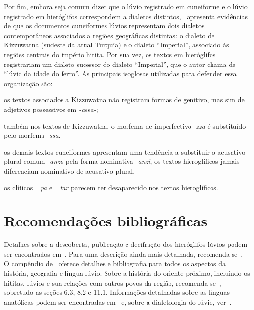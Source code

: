 Por fim, embora seja comum dizer que o lúvio registrado em cuneiforme e o
lúvio registrado em hieróglifos correspondem a dialetos
distintos,~\citet{Yakubovich2010} apresenta evidências de que os
documentos cuneiformes lúvios representam dois dialetos contemporâneos
associados a regiões geográficas distintas: o dialeto de Kizzuwatna (sudeste da
atual Turquia) e o dialeto ``Imperial'', associado às regiões centrais do
império hitita.
Por sua vez, os textos em hieróglifos registrariam um dialeto sucessor do
dialeto ``Imperial'', que o autor chama de ``lúvio da idade do ferro''.
As principais isoglosas utilizadas para defender essa organização são:
\begin{inparaenum}
	\item os textos associados a Kizzuwatna não registram formas de genitivo, mas
	sim de adjetivos possessivos em \emph{-assa-};
	\item também nos textos de Kizzuwatna, o morfema de imperfectivo \emph{-zza}
	é substituído pelo morfema \emph{-ssa}.
	\item os demais textos cuneiformes apresentam uma tendência a substituir o
	acusativo plural comum \emph{-anza} pela forma nominativa \emph{-anzi},
	os textos hieroglíficos jamais diferenciam nominativo de acusativo plural.
	\item os clíticos \emph{=pa} e \emph{=tar} parecem ter desaparecido nos textos
	hieroglíficos.
\end{inparaenum}


\begin{center}
\end{center}

\section{Recomendações bibliográficas}

Detalhes sobre a descoberta, publicação e decifração dos hieróglifos lúvios
podem ser encontrados em~\citet[pp. 131ff.]{HawkinsScripts}. Para uma descrição
ainda mais detalhada, recomenda-se~\citet[pp. 6-17]{CHLI11}.
O compêndio de~\citet{Melchert2003} oferece detalhes e bibliografia para todos
os aspectos da história, geografia e língua lúvio.
Sobre a história do oriente próximo, incluindo os hititas, lúvios e sua
relações com outros povos da região, reco\-men\-da-se~\citet{Mieroop2015}, sobretudo
as seções 6.3, 8.2 e 11.1.
Informações detalhadas sobre as línguas anatólicas podem ser encontradas
em~\citet[239--308]{HSK41.1} e, sobre a dialetologia do lúvio,
ver~\citet{Yakubovich2010}.
